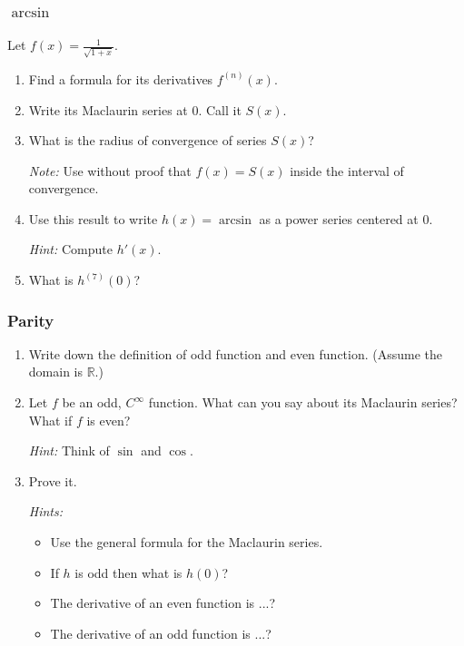 \documentclass[14pt]{beamer}
\begin{document}
\begin{frame}[t]
	\frametitle{$\arcsin$}

	Let $\displaystyle f(x)=\frac{1}{\sqrt{1+x}}$.
	\begin{enumerate}
		\item Find a formula for its derivatives $\displaystyle f^{(n)}(x)$.
			\vspace{.2cm}

		\item Write its Maclaurin series at $0$. Call it $S(x)$.
			\vspace{.2cm}

		\item What is the radius of convergence of series $S(x)$?

			{\fontsize{12}{12}\selectfont \emph{Note:} Use without proof that $\displaystyle f(x)=S(x)$ inside the interval of convergence. }
			\vspace{.2cm}

		\item Use this result to write $h(x) = \arcsin$ as a power series centered at
			$0$.

			{\fontsize{12}{12}\selectfont \emph{Hint:} Compute $\displaystyle h'(x)$. }
			\vspace{.2cm}

		\item What is $\displaystyle h^{(7)}(0)$?
	\end{enumerate}
\end{frame}

\begin{frame}[t]
	\fontsize{13}{13}\selectfont
	\frametitle{Parity}

	\begin{enumerate}
		\item Write down the definition of odd function and even function. (Assume the
			domain is $\mathbb{R}$.)
			\vspace{.2cm}

		\item Let $f$ be an odd, $C^{\infty}$ function. What can you say about its Maclaurin
			series? What if $f$ is even?
			\vspace{.2cm}

			\emph{Hint:} Think of $\sin$ and $\cos$.
			\vspace{.2cm}

		\item Prove it.
			\vspace{.2cm}

			\emph{Hints:}
			\begin{itemize}
				\item Use the general formula for the Maclaurin series.

				\item If $h$ is odd then what is $h(0)$?

				\item The derivative of an even function is ...?

				\item The derivative of an odd function is ...?
			\end{itemize}
	\end{enumerate}
\end{frame}
\end{document}
